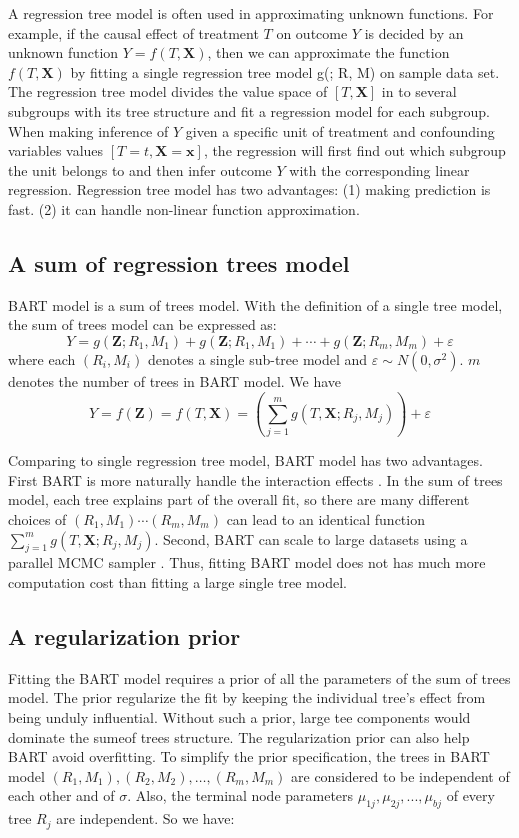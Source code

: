 A regression tree model is often used in approximating unknown functions. For example, if the causal effect of treatment $T$ on outcome $Y$ is decided by an unknown function $Y=f(T,\pmb{X})$, then we can approximate the function $f(T,\pmb{X})$ by fitting a single regression tree model g(; R, M) on sample data set. The regression tree model divides the value space of $[T,\pmb{X}]$ in to several subgroups with its tree structure and fit a regression model for each subgroup. When making inference of $Y$ given a specific unit of treatment and confounding variables values $[T=t,\pmb{X}=\pmb{x}]$, the regression will first find out which subgroup the unit belongs to and then infer outcome $Y$ with the corresponding linear regression. Regression tree model has two advantages: (1) making prediction is fast. (2) it can handle non-linear function approximation.


\subsection{A sum of regression trees model}
BART model is a sum of trees model. With the definition of a single tree model, the sum of trees model can be expressed as:
\begin{equation*}
Y = g(\pmb{Z};{R_1},{M_1}) + g(\pmb{Z};{R_1},{M_1}) +  \cdots  + g(\pmb{Z};{R_m},{M_m}) + \varepsilon  
\end{equation*}
where each $(R_i,M_i)$ denotes a single sub-tree model and $\varepsilon  \sim N(0,{\sigma ^2})$.  $m$ denotes the number of trees in BART model. We have
 \begin{equation*}
 Y =f(\pmb{Z})=f(T,\pmb{X})= \left( {\sum\limits_{j = 1}^m {g(T,\pmb{X};{R_j},{M_j})} } \right) + \varepsilon 
 \end{equation*}

Comparing to single regression tree model, BART model has two advantages. First BART is more naturally handle the interaction effects . In the sum of trees model, each tree explains part of the overall fit, so there are many different choices of $(R_1,M_1) \cdots (R_m,M_m)$ can lead to an identical function$ \sum\limits_{j = 1}^m {g(T,\pmb{X};{R_j},{M_j})} $. Second, BART can scale to large datasets using a parallel MCMC sampler \cite{Pratola2015}. Thus, fitting BART model does not has much more computation cost than fitting a large single tree model.  

\subsection{A regularization prior}
Fitting the BART model requires a prior of all the parameters of the sum of trees model.  The prior regularize the fit by keeping the individual tree's effect from being unduly influential. Without such a prior, large  tee components would dominate the sumeof trees structure. The regularization prior can also help BART avoid overfitting. To simplify the prior specification, the trees in BART model $(R_1, M_1), (R_2,M_2), \ldots, (R_m, M_m) $ are considered to be independent of each other and of $\sigma$. Also, the terminal node parameters $ \mu _{1j}, \mu _{2j}, . . ., \mu _{bj} $ of every tree $R_j$ are independent. So we have:

